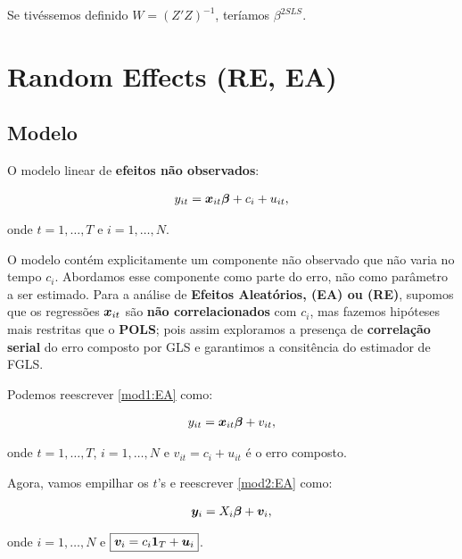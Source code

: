 \documentclass[11pt,oneside,a4paper]{article}
\numberwithin{equation}{section}
\begin{document}
\noindent
Se tivéssemos definido $W = (Z'Z)^{-1}$, teríamos $\beta^{2SLS}$.

\clearpage
\section{Random Effects (RE, EA)}


\subsection*{Modelo}

O modelo linear de \textbf{efeitos não observados}:

\vspace{-1 em}
\begin{align} \label{mod1:EA}
	y_{it} = \boldsymbol{x}_{it} \boldsymbol{\beta} + c_{i} + u_{it},
\end{align}

\noindent
onde
$t = 1, \dots, T$ e $i = 1, \dots, N$.

O modelo contém explicitamente um componente não observado que não varia no tempo $c_{i}$.
Abordamos esse componente como parte do erro, não como parâmetro a ser estimado.
Para a análise de \textbf{Efeitos Aleatórios, (EA) ou (RE)}, supomos que os regressões $\boldsymbol{x}_{it}$ são \textbf{não correlacionados} com $c_{i}$, mas fazemos hipóteses mais restritas que o \textbf{POLS}; pois assim exploramos a presença de \textbf{correlação serial} do erro composto por GLS e garantimos a consitência do estimador de FGLS.

Podemos reescrever \eqref{mod1:EA} como:

\vspace{-1 em}
\begin{align} \label{mod2:EA}
	y_{it} = \boldsymbol{x}_{it} \boldsymbol{\beta} + v_{it},
\end{align}

\noindent
onde
$t = 1, \dots, T$, $i = 1, \dots, N$ e $\boxed{v_{it} = c_{i} + u_{it}}$ é o erro composto.

Agora, vamos empilhar os $t$'s e reescrever \eqref{mod2:EA} como:

\vspace{-1 em}
\begin{align} \label{mod3:EA}
	\boldsymbol{y}_{i} = X_{i} \boldsymbol{\beta} + \boldsymbol{v}_{i},
\end{align}

\noindent
onde
$i = 1, \dots, N$ e $\boxed{\boldsymbol{v}_{i} = c_{i} \boldsymbol{1}_{T} + \boldsymbol{u}_{i}}$.
\end{document}
